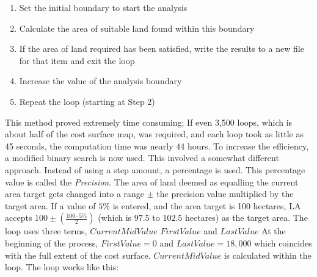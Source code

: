    \begin{enumerate} 
   
   \item  Set the initial boundary to start the analysis
   
   \item  Calculate the area of suitable land found within this boundary 
   
   \item If the area of land required has been satisfied, write the results to
   a new file for that item and exit the loop 
   
   \item  Increase the value of the analysis boundary 
   
   \item  Repeat the loop (starting at Step 2)
   
   \end{enumerate}

This method proved extremely time consuming;  If even 3,500 loops, which is
about half of the cost surface map, was required, and each loop took as little
as 45 seconds, the computation time was nearly 44 hours.   To increase the
efficiency, a modified binary search is now used.  This involved a somewhat
different approach.  Instead of using a step amount, a percentage is used.
This percentage value is called the \textit{Precision}. 
The area of land deemed as equalling the current area target gets changed into
a range $\pm$ the precision value multiplied by the target area. 
If a value of $5\%$ is entered, and the area
target is 100 hectares, LA accepts $100 \pm(\frac{100 \cdot
5\%}{2})$ (which is $97.5$ to $102.5$ hectares) as the target area.  The loop
uses three terms, $CurrentMidValue$ $FirstValue$ and $LastValue$ At the
beginning of the process, $FirstValue=0$ and $LastValue=18,000$ which coincides
with the full extent of the cost surface.  $CurrentMidValue$ is calculated
within the loop.  The loop works like this:

